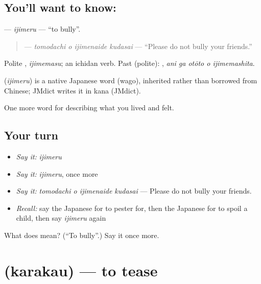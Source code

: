 \subsection*{You'll want to know: }
\textbf{} — \emph{ijimeru} — \textquotedblleft{}to bully\textquotedblright{}.

\begin{quote}
\textbf{  } — \emph{tomodachi o ijimenaide kudasai} — \textquotedblleft{}Please do not bully your friends.\textquotedblright{}
\end{quote}

Polite \textbf{}, \emph{ijimemasu}; an ichidan verb. Past (polite): \textbf{  }, \emph{ani ga otōto o ijimemashita}.

\begin{cousinweb}
\textbf{} (\emph{ijimeru}) is a native Japanese word (wago), inherited rather than borrowed from Chinese; JMdict writes it in kana (JMdict).
\end{cousinweb}

\begin{grammarlens}[title={What you've built}]
One more word for describing what you lived and felt.
\end{grammarlens}

\subsection*{Your turn}
\begin{itemize}
\raggedright
  \item \emph{Say it:} \emph{ijimeru}
  \item \emph{Say it:} \emph{ijimeru}, once more
  \item \emph{Say it:} \emph{tomodachi o ijimenaide kudasai} — Please do not bully your friends.
  \item \emph{Recall:} say the Japanese for to pester for, then the Japanese for to spoil a child, then say \emph{ijimeru} again
\end{itemize}

\begin{tcolorbox}[breakable,colback=teal!4,colframe=teal!35!black,title={Before you move on}]
What does  mean? (\textquotedblleft{}To bully\textquotedblright{}.) Say it once more.
\end{tcolorbox}
\section[\texorpdfstring{\ja{からかう} (karakau)}{からかう (karakau)}]{ (karakau) — to tease}

